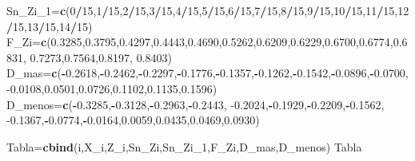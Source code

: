 \documentclass[
  a4paper,
  oneside,
  openany]{book}
\newenvironment{Shaded}{\begin{snugshade}}{\end{snugshade}}
\newcommand{\DecValTok}[1]{\textcolor[rgb]{0.00,0.00,0.81}{#1}}
\newcommand{\FloatTok}[1]{\textcolor[rgb]{0.00,0.00,0.81}{#1}}
\newcommand{\KeywordTok}[1]{\textcolor[rgb]{0.13,0.29,0.53}{\textbf{#1}}}
\newcommand{\NormalTok}[1]{#1}
\newcommand{\OperatorTok}[1]{\textcolor[rgb]{0.81,0.36,0.00}{\textbf{#1}}}
\begin{document}
\begin{Shaded}
\begin{Highlighting}[]
\NormalTok{Sn\_Zi\_}\DecValTok{1}\NormalTok{=}\KeywordTok{c}\NormalTok{(}\DecValTok{0}\OperatorTok{/}\DecValTok{15}\NormalTok{,}\DecValTok{1}\OperatorTok{/}\DecValTok{15}\NormalTok{,}\DecValTok{2}\OperatorTok{/}\DecValTok{15}\NormalTok{,}\DecValTok{3}\OperatorTok{/}\DecValTok{15}\NormalTok{,}\DecValTok{4}\OperatorTok{/}\DecValTok{15}\NormalTok{,}\DecValTok{5}\OperatorTok{/}\DecValTok{15}\NormalTok{,}\DecValTok{6}\OperatorTok{/}\DecValTok{15}\NormalTok{,}\DecValTok{7}\OperatorTok{/}\DecValTok{15}\NormalTok{,}\DecValTok{8}\OperatorTok{/}\DecValTok{15}\NormalTok{,}\DecValTok{9}\OperatorTok{/}\DecValTok{15}\NormalTok{,}\DecValTok{10}\OperatorTok{/}\DecValTok{15}\NormalTok{,}\DecValTok{11}\OperatorTok{/}\DecValTok{15}\NormalTok{,}\DecValTok{12}\OperatorTok{/}\DecValTok{15}\NormalTok{,}\DecValTok{13}\OperatorTok{/}\DecValTok{15}\NormalTok{,}\DecValTok{14}\OperatorTok{/}\DecValTok{15}\NormalTok{)}
\NormalTok{F\_Zi=}\KeywordTok{c}\NormalTok{(}\FloatTok{0.3285}\NormalTok{,}\FloatTok{0.3795}\NormalTok{,}\FloatTok{0.4297}\NormalTok{,}\FloatTok{0.4443}\NormalTok{,}\FloatTok{0.4690}\NormalTok{,}\FloatTok{0.5262}\NormalTok{,}\FloatTok{0.6209}\NormalTok{,}\FloatTok{0.6229}\NormalTok{,}\FloatTok{0.6700}\NormalTok{,}\FloatTok{0.6774}\NormalTok{,}\FloatTok{0.6831}\NormalTok{,}
       \FloatTok{0.7273}\NormalTok{,}\FloatTok{0.7564}\NormalTok{,}\FloatTok{0.8197}\NormalTok{, }\FloatTok{0.8403}\NormalTok{)}
\NormalTok{D\_mas=}\KeywordTok{c}\NormalTok{(}\OperatorTok{{-}}\FloatTok{0.2618}\NormalTok{,}\OperatorTok{{-}}\FloatTok{0.2462}\NormalTok{,}\OperatorTok{{-}}\FloatTok{0.2297}\NormalTok{,}\OperatorTok{{-}}\FloatTok{0.1776}\NormalTok{,}\OperatorTok{{-}}\FloatTok{0.1357}\NormalTok{,}\OperatorTok{{-}}\FloatTok{0.1262}\NormalTok{,}\OperatorTok{{-}}\FloatTok{0.1542}\NormalTok{,}\OperatorTok{{-}}\FloatTok{0.0896}\NormalTok{,}\OperatorTok{{-}}\FloatTok{0.0700}\NormalTok{,}
        \FloatTok{{-}0.0108}\NormalTok{,}\FloatTok{0.0501}\NormalTok{,}\FloatTok{0.0726}\NormalTok{,}\FloatTok{0.1102}\NormalTok{,}\FloatTok{0.1135}\NormalTok{,}\FloatTok{0.1596}\NormalTok{)}
\NormalTok{D\_menos=}\KeywordTok{c}\NormalTok{(}\OperatorTok{{-}}\FloatTok{0.3285}\NormalTok{,}\OperatorTok{{-}}\FloatTok{0.3128}\NormalTok{,}\OperatorTok{{-}}\FloatTok{0.2963}\NormalTok{,}\OperatorTok{{-}}\FloatTok{0.2443}\NormalTok{, }\FloatTok{{-}0.2024}\NormalTok{,}\OperatorTok{{-}}\FloatTok{0.1929}\NormalTok{,}\OperatorTok{{-}}\FloatTok{0.2209}\NormalTok{,}\OperatorTok{{-}}\FloatTok{0.1562}\NormalTok{,}
           \FloatTok{{-}0.1367}\NormalTok{,}\OperatorTok{{-}}\FloatTok{0.0774}\NormalTok{,}\OperatorTok{{-}}\FloatTok{0.0164}\NormalTok{,}\FloatTok{0.0059}\NormalTok{,}\FloatTok{0.0435}\NormalTok{,}\FloatTok{0.0469}\NormalTok{,}\FloatTok{0.0930}\NormalTok{)  }

\NormalTok{Tabla=}\KeywordTok{cbind}\NormalTok{(i,X\_i,Z\_i,Sn\_Zi,Sn\_Zi\_}\DecValTok{1}\NormalTok{,F\_Zi,D\_mas,D\_menos)                                                                                                                                                      }
\NormalTok{Tabla}
\end{Highlighting}
\end{Shaded}
\end{document}
